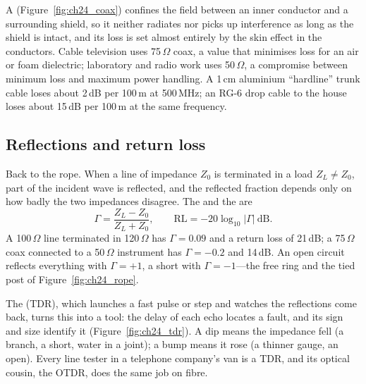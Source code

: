 A  (Figure~\ref{fig:ch24_coax}) confines the field between an inner conductor
and a surrounding shield, so it neither radiates nor picks up interference as long as the shield
is intact, and its loss is set almost entirely by the skin effect in the conductors. Cable
television uses 75\,$\Omega$ coax, a value that minimises loss for an air or foam dielectric;
laboratory and radio work uses 50\,$\Omega$, a compromise between minimum loss and maximum power
handling. A 1\,cm aluminium ``hardline'' trunk cable loses about 2\,dB per 100\,m at 500\,MHz; an
RG-6 drop cable to the house loses about 15\,dB per 100\,m at the same frequency.


\subsection{Reflections and return loss}

Back to the rope. When a line of impedance $Z_0$ is terminated in a load $Z_L\ne Z_0$, part of the
incident wave is reflected, and the reflected fraction depends only on how badly the two
impedances disagree. The  and the  are
\begin{equation}
\Gamma=\frac{Z_L-Z_0}{Z_L+Z_0},\qquad \mathrm{RL}=-20\log_{10}|\Gamma|\ \text{dB}.
\label{eq:ch24:gamma}
\end{equation}
A 100\,$\Omega$ line terminated in 120\,$\Omega$ has $\Gamma=0.09$ and a return loss of 21\,dB; a
75\,$\Omega$ coax connected to a 50\,$\Omega$ instrument has $\Gamma=-0.2$ and 14\,dB. An open
circuit reflects everything with $\Gamma=+1$, a short with $\Gamma=-1$---the free ring and the
tied post of Figure~\ref{fig:ch24_rope}.

The  (TDR), which launches a fast pulse or step and watches the
reflections come back, turns this into a tool: the delay of each echo locates a fault, and its
sign and size identify it (Figure~\ref{fig:ch24_tdr}). A dip means the impedance fell (a branch, a
short, water in a joint); a bump means it rose (a thinner gauge, an open). Every line tester in a
telephone company's van is a TDR, and its optical cousin, the OTDR, does the same job on fibre.



